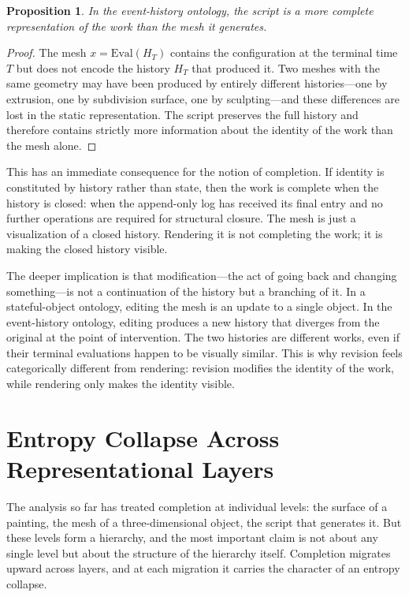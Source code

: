 \documentclass[12pt, twoside]{article}
\theoremstyle{plain}
\newtheorem{proposition}[theorem]{Proposition}
\theoremstyle{definition}
\theoremstyle{remark}
\begin{document}
\begin{proposition}
\label{prop:script-primacy}
In the event-history ontology, the script is a more complete representation of the work than the mesh it generates.
\end{proposition}

\begin{proof}
The mesh $x = \text{Eval}(H_T)$ contains the configuration at the terminal time $T$ but does not encode the history $H_T$ that produced it. Two meshes with the same geometry may have been produced by entirely different histories---one by extrusion, one by subdivision surface, one by sculpting---and these differences are lost in the static representation. The script preserves the full history and therefore contains strictly more information about the identity of the work than the mesh alone.
\end{proof}

This has an immediate consequence for the notion of completion. If identity is constituted by history rather than state, then the work is complete when the history is closed: when the append-only log has received its final entry and no further operations are required for structural closure. The mesh is just a visualization of a closed history. Rendering it is not completing the work; it is making the closed history visible.

The deeper implication is that modification---the act of going back and changing something---is not a continuation of the history but a branching of it. In a stateful-object ontology, editing the mesh is an update to a single object. In the event-history ontology, editing produces a new history that diverges from the original at the point of intervention. The two histories are different works, even if their terminal evaluations happen to be visually similar. This is why revision feels categorically different from rendering: revision modifies the identity of the work, while rendering only makes the identity visible.

\section{Entropy Collapse Across Representational Layers}
\label{sec:entropy-collapse}

The analysis so far has treated completion at individual levels: the surface of a painting, the mesh of a three-dimensional object, the script that generates it. But these levels form a hierarchy, and the most important claim is not about any single level but about the structure of the hierarchy itself. Completion migrates upward across layers, and at each migration it carries the character of an entropy collapse.
\end{document}
